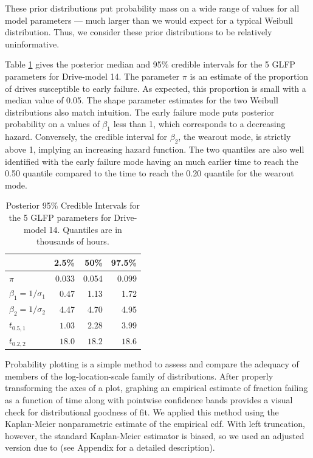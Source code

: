 \documentclass[12pt]{article}
\begin{document}
\noindent These prior distributions put probability mass on a wide range of values for all model parameters --- much larger than we would expect for a typical Weibull distribution.  Thus, we consider these prior distributions to be relatively uninformative. 


Table \ref{table:1} gives the posterior median and 95\% credible intervals for the 5 GLFP parameters for Drive-model 14.  The parameter $\pi$ is an estimate of the proportion of drives susceptible to early failure.  As expected, this proportion is small with a median value of 0.05.  The shape parameter estimates for the two Weibull distributions also match intuition.  The early failure mode puts posterior probability on a values of $\beta_1$ less than 1, which corresponds to a decreasing hazard.  Conversely, the credible interval for $\beta_2$, the wearout mode, is strictly above 1, implying an increasing hazard function.  The two quantiles are also well identified with the early failure mode having an much earlier time to reach the 0.50 quantile compared to the time to reach the 0.20 quantile for the wearout mode. 

\begin{table}[H]
\centering
\begin{tabular}{lrrr}
  \hline
 & 2.5\% & 50\% & 97.5\% \\ 
  \hline
$\pi$ & 0.033 & 0.054 & 0.099 \\ 
 $\beta_1 = 1/\sigma_1 $ & 0.47 & 1.13 & 1.72 \\ 
  $\beta_2 = 1/\sigma_2$ & 4.47 & 4.70 & 4.95 \\ 
  $t_{0.5,1}$ & $1.03$  & $2.28$ & $3.99$\\ 
  $t_{0.2,2}$ & $18.0$ & $18.2$ & $18.6$ \\ 
   \hline
\end{tabular}
\caption{Posterior 95\% Credible Intervals for the 5 GLFP parameters for Drive-model 14.  Quantiles are in thousands of hours.}
\label{table:1}
\end{table}


Probability plotting is a simple method to assess and compare the adequacy of members of the log-location-scale family of distributions.  After properly transforming the axes of a plot, graphing an empirical estimate of fraction failing as a function of time along with pointwise confidence bands provides a visual check for distributional goodness of fit.  We applied this method using the Kaplan-Meier nonparametric estimate of the empirical cdf.  With left truncation, however, the standard Kaplan-Meier estimator is biased, so we used an adjusted version due to \citet[Chapter 11]{meeker} (see Appendix for a detailed description).   
\end{document}
